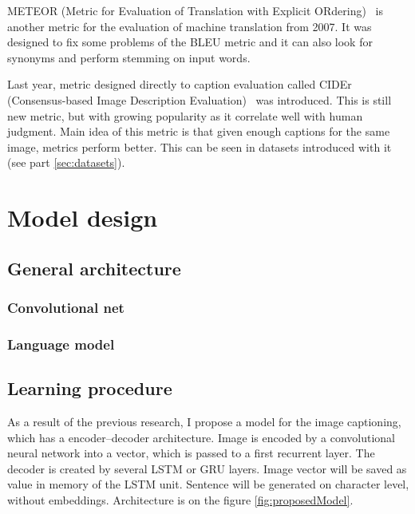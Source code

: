 METEOR (Metric for Evaluation of Translation with Explicit ORdering)~\cite{Lavie:2007:MAM:1626355.1626389} is another metric for the evaluation of machine translation from 2007. It was designed to fix some problems of the BLEU metric and it can also look for synonyms and perform stemming on input words.

Last year, metric designed directly to caption evaluation called CIDEr (Consensus-based Image Description Evaluation)~\cite{Vedantam_2015_CVPR} was introduced. This is still new metric, but with growing popularity as it correlate well with human judgment. Main idea of this metric is that given enough captions for the same image, metrics perform better. This can be seen in datasets introduced with it (see part \ref{sec:datasets}).

\chapter{Model design}\label{chp:model}

\section{General architecture}
\subsection{Convolutional net}
\subsection{Language model}
\section{Learning procedure}
As a result of the previous research, I propose a model for the image captioning, which has a encoder--decoder architecture. Image is encoded by a convolutional neural network into a vector, which is passed to a first recurrent layer. The decoder is created by several LSTM or GRU layers. Image vector will be saved as value in memory of the LSTM unit. Sentence will be generated on character level, without embeddings. Architecture is on the figure \ref{fig:proposedModel}.

